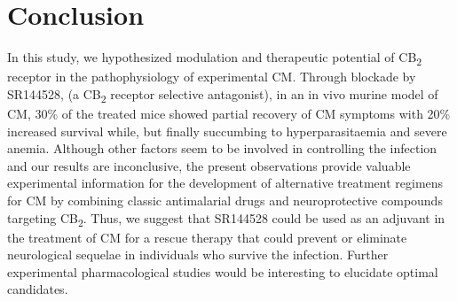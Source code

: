 \documentclass[empirical, authordate]{jote-new-article}
\begin{document}
\section{Conclusion}

In this study, we hypothesized modulation and therapeutic potential of CB\textsubscript{2} receptor in the pathophysiology of experimental CM. Through blockade by SR144528, (a CB\textsubscript{2} receptor selective antagonist), in an in vivo murine model of CM, 30\% of the treated mice showed partial recovery of CM symptoms with 20\% increased survival while, but finally succumbing to hyperparasitaemia and severe anemia. Although other factors seem to be involved in controlling the infection and our results are inconclusive, the present observations provide valuable experimental information for the development of alternative treatment regimens for CM by combining classic antimalarial drugs and neuroprotective compounds targeting CB\textsubscript{2}. Thus, we suggest that SR144528 could be used as an adjuvant in the treatment of CM for a rescue therapy that could prevent or eliminate neurological sequelae in individuals who survive the infection. Further experimental pharmacological studies would be interesting to elucidate optimal candidates.

\nocite{*}
\printbibliography
\end{document}
